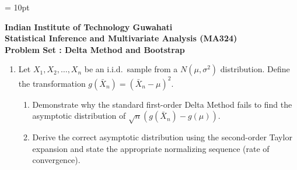 \documentclass[12pt]{article}%
\begin{document}
\parskip = 10pt

\begin{center}
   \textbf{Indian Institute of Technology Guwahati\\ Statistical Inference and
   Multivariate Analysis (MA324) \\ Problem Set : Delta Method and Bootstrap}
\end{center}

\singlespacing

\begin{enumerate}[leftmargin=*]

   \item Let $X_1, X_2, \dots, X_n$ be an i.i.d.~sample from a $N(\mu,
      \sigma^2)$ distribution. Define the transformation $g(\bar{X}_n) =
      (\bar{X}_n - \mu)^2$.
      \begin{enumerate}
         \item[(a)] Demonstrate why the standard first-order Delta Method fails
            to find the asymptotic distribution of $\sqrt{n}(g(\bar{X}_n) -
            g(\mu))$.
         \item[(b)] Derive the correct asymptotic distribution using the
            second-order Taylor expansion and state the appropriate normalizing
            sequence (rate of convergence).
      \end{enumerate}


\end{enumerate}
\end{document}
